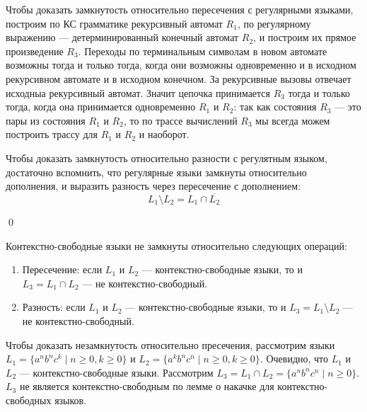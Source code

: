 Чтобы доказать замкнутость относительно пересечения с регулярными языками, построим по КС грамматике рекурсивный автомат $R_1$, по регулярному выражению --- детерминированный конечный автомат $R_2$, и построим их прямое произведение $R_3$.
Переходы по терминальным символам в новом автомате возможны тогда и только тогда, когда они возможны одновременно и в исходном рекурсивном автомате и в исходном конечном. 
За рекурсивные вызовы отвечает исходныа рекурсивный автомат. 
Значит цепочка принимается $R_3$ тогда и только тогда, когда она принимается одновременно $R_1$ и $R_2$: так как состояния $R_3$ --- это пары из состояния $R_1$ и $R_2$, то по трассе вычислений $R_3$ мы всегда можем построить трассу для $R_1$ и $R_2$ и наоборот.

Чтобы доказать замкнутость относительно разности с регулятным языком, достаточно вспомнить, что регулярные языки замкнуты относительно дополнения, и выразить разность через пересечение с дополнением: 
$$
L_1 \setminus L_2 = L_1 \cap \overline{L_2}
$$

\qed

\begin{theorem}
Контекстно-свободные языки не замкнуты относительно следующих операций:
\begin{enumerate}
  \item Пересечение: если $L_1$ и $L_2$ --- контекстно-свободные языки, то и $L_3 = L_1 \cap L_2$ --- не контекстно-свободный.
  \item Разность: если $L_1$ и $L_2$ --- контекстно-свободные языки, то и $L_3 = L_1 \setminus L_2$ --- не контекстно-свободный.
\end{enumerate}
\end{theorem}

Чтобы доказать незамкнутость относительно пресечения, рассмотрим языки $L_1 = \{a^n b^n c^k \mid n \geq 0, k \geq 0\}$ и $L_2 = \{a^k b^n c^n \mid n \geq 0, k \geq 0\}$.
Очевидно, что $L_1$ и $L_2$ --- контекстно-свободные языки.
Рассмотрим $L_3 = L_1 \cap L_2 = \{a^n b^n c^n \mid n \geq 0\}$. 
$L_3$ не является контекстно-свободным по лемме о накачке для контекстно-свободных языков.

